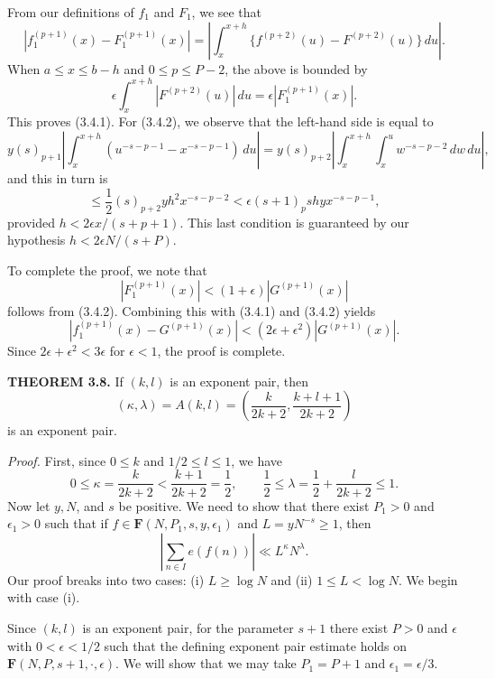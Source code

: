\documentclass[10pt]{article}
\newcommand{\Fclass}{\mathbf{F}}
\begin{document}
From our definitions of $f_1$ and $F_1$, we see that
\[
 |f_1^{(p+1)}(x)-F_1^{(p+1)}(x)|
 =\left|\int_x^{x+h}
   \{f^{(p+2)}(u)-F^{(p+2)}(u)\}\,du\right|.
\]
When $a\leq x\leq b-h$ and $0\leq p\leq P-2$, the above is bounded by
\[
 \epsilon\int_x^{x+h}|F^{(p+2)}(u)|\,du
 =\epsilon|F_1^{(p+1)}(x)|.
\]
This proves (3.4.1). For (3.4.2), we observe that the left-hand side is equal
to
\[
 y(s)_{p+1}\left|\int_x^{x+h}
  (u^{-s-p-1}-x^{-s-p-1})\,du\right|
 =y(s)_{p+2}\left|\int_x^{x+h}\int_x^u
  w^{-s-p-2}\,dw\,du\right|,
\]
and this in turn is
\[
 \leq\frac12(s)_{p+2}yh^2x^{-s-p-2}
 <\epsilon(s+1)_p shy x^{-s-p-1},
\]
provided $h<2\epsilon x/(s+p+1)$. This last condition is guaranteed by our
hypothesis $h<2\epsilon N/(s+P)$.

To complete the proof, we note that
\[
 |F_1^{(p+1)}(x)|<(1+\epsilon)|G^{(p+1)}(x)|
\]
follows from (3.4.2). Combining this with (3.4.1) and (3.4.2) yields
\[
 |f_1^{(p+1)}(x)-G^{(p+1)}(x)|
 <(2\epsilon+\epsilon^2)|G^{(p+1)}(x)|.
\]
Since $2\epsilon+\epsilon^2<3\epsilon$ for $\epsilon<1$, the proof is
complete.

\medskip
\noindent\textbf{THEOREM 3.8.}
If $(k,l)$ is an exponent pair, then
\[
 (\kappa,\lambda)=A(k,l)
 =\left(\frac{k}{2k+2},\frac{k+l+1}{2k+2}\right)
\]
is an exponent pair.

\noindent\textit{Proof.}
First, since $0\leq k$ and $1/2\leq l\leq1$, we have
\[
 0\leq\kappa=\frac{k}{2k+2}<\frac{k+1}{2k+2}=\frac12,
 \qquad
 \frac12\leq\lambda=\frac12+\frac{l}{2k+2}\leq1.
\]
Now let $y,N$, and $s$ be positive. We need to show that there exist
$P_1>0$ and $\epsilon_1>0$ such that if
$f\in\Fclass(N,P_1,s,y,\epsilon_1)$ and $L=yN^{-s}\geq1$, then
\[
 \left|\sum_{n\in I}e(f(n))\right|\ll L^\kappa N^\lambda.
\]
Our proof breaks into two cases: (i) $L\geq\log N$ and
(ii) $1\leq L<\log N$. We begin with case (i).

Since $(k,l)$ is an exponent pair, for the parameter $s+1$ there exist
$P>0$ and $\epsilon$ with $0<\epsilon<1/2$ such that the defining exponent
pair estimate holds on $\Fclass(N,P,s+1,\cdot,\epsilon)$. We will show that
we may take $P_1=P+1$ and $\epsilon_1=\epsilon/3$.
\end{document}
